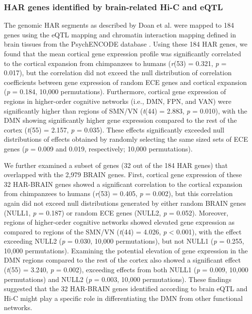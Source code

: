 \begin{refsection}
\subsubsection{HAR genes identified by brain-related Hi-C and eQTL}
The genomic HAR segments as described by Doan et al. \citep{doan2016mutations} were mapped to 184 genes using the eQTL mapping and chromatin interaction mapping defined in brain tissues from the PsychENCODE database \citep{wang2018comprehensive}. Using these 184 HAR genes, we found that the mean cortical gene expression profile was significantly correlated to the cortical expansion from chimpanzees to humans (\textit{r}(53) = 0.321, \textit{p} = 0.017), but the correlation did not exceed the null distribution of correlation coefficients between gene expression of random ECE genes and cortical expansion (\textit{p} = 0.184, 10,000 permutations). Furthermore, cortical gene expression of regions in higher-order cognitive networks (i.e., DMN, FPN, and VAN) were significantly higher than regions of SMN/VN (\textit{t}(44) = 2.883, \textit{p} = 0.010), with the DMN showing significantly higher gene expression compared to the rest of the cortex (\textit{t}(55) = 2.157, \textit{p} = 0.035). These effects significantly exceeded null distributions of effects obtained by randomly selecting the same sized sets of ECE genes (\textit{p} = 0.009 and 0.019, respectively; 10,000 permutations).

We further examined a subset of genes (32 out of the 184 HAR genes) that overlapped with the 2,979 BRAIN genes. First, cortical gene expression of these 32 HAR-BRAIN genes showed a significant correlation to the cortical expansion from chimpanzees to humans (\textit{r}(53) = 0.405, \textit{p} = 0.002), but this correlation again did not exceed null distributions generated by either random BRAIN genes (NULL1, \textit{p} = 0.187) or random ECE genes (NULL2, \textit{p} = 0.052). Moreover, regions of higher-order cognitive networks showed elevated gene expression as compared to regions of the SMN/VN (\textit{t}(44) = 4.026, \textit{p} < 0.001), with the effect exceeding NULL2 (\textit{p} = 0.030, 10,000 permutations), but not NULL1 (\textit{p} = 0.255, 10,000 permutations). Examining the potential elevation of gene expression in the DMN regions compared to the rest of the cortex also showed a significant effect (\textit{t}(55) = 3.240, \textit{p} = 0.002), exceeding effects from both NULL1 (\textit{p} = 0.009, 10,000 permutations) and NULL2 (\textit{p} = 0.003, 10,000 permutations). These findings suggested that the 32 HAR-BRAIN genes identified according to brain eQTL and Hi-C might play a specific role in differentiating the DMN from other functional networks.


\end{refsection}

